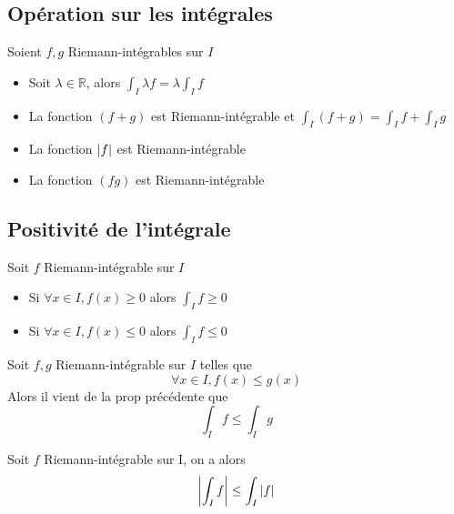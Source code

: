 \documentclass[11pt,colorlinks]{book}
\theoremstyle{mytheoremstyle}
\theoremstyle{mytheoremstyle}
\theoremstyle{mytheoremstyle}
\theoremstyle{mytheoremstyle}
\theoremstyle{mytheoremstyle}
\theoremstyle{mytheoremstyle}
\theoremstyle{mytheoremstyle}
\theoremstyle{mytheoremstyle}
\theoremstyle{myproblemstyle}
\def\mbb#1{\mathbb{#1}}
\def\bR{\mbb{R}}
\begin{document}
  \subsection{Opération sur les intégrales}
  \begin{prop}
    Soient $f,g$ Riemann-intégrables sur $I$
    \begin{itemize}
      \item Soit $\lambda \in \bR$, alors $\int_I \lambda f = \lambda \int_I f$
      \item La fonction $(f+g)$ est Riemann-intégrable et $\int_I (f+g) = \int_I f + \int_I g$
      \item La fonction $\abs{f}$ est Riemann-intégrable
      \item La fonction $(fg)$ est Riemann-intégrable
    \end{itemize}
  \end{prop}
  \subsection{Positivité de l'intégrale}
  \begin{prop}
    Soit $f$ Riemann-intégrable sur $I$
    \begin{itemize}
      \item Si $\forall x \in I, f(x) \geq 0$ alors $\int_I f \geq 0$
      \item Si $\forall x \in I, f(x) \leq 0$ alors $\int_I f \leq 0$
    \end{itemize}
  \end{prop}
  \begin{theorem}
    Soit $f,g$ Riemann-intégrable sur $I$ telles que 
    \begin{equation*}
      \forall x \in I, f(x) \leq g(x)
    \end{equation*}
    Alors il vient de la prop précédente que 
    \begin{equation*}
      \int_I f \leq \int_I g
    \end{equation*}
  \end{theorem}
  \begin{prop}
    Soit $f$ Riemann-intégrable sur I, on a alors 
    \begin{equation*}
      \abs{\int_I f} \leq \int_I \abs{f}
    \end{equation*}
  \end{prop}
\end{document}
